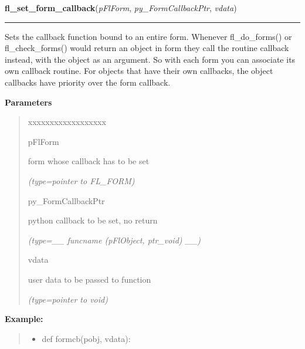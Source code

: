 \hspace{.8\funcindent}\begin{boxedminipage}{\funcwidth}

    \raggedright \textbf{fl\_set\_form\_callback}(\textit{pFlForm}, \textit{py\_FormCallbackPtr}, \textit{vdata})

    \vspace{-1.5ex}

    \rule{\textwidth}{0.5\fboxrule}
\setlength{\parskip}{2ex}
    Sets the callback function bound to an entire form. Whenever 
    fl\_do\_forms() or fl\_check\_forms() would return an object in form 
    they call the routine callback instead, with the object as an argument.
    So with each form you can associate its own callback routine. For 
    objects that have their own callbacks, the object callbacks have 
    priority over the form callback.

\setlength{\parskip}{1ex}
      \textbf{Parameters}
      \vspace{-1ex}

      \begin{quote}
        \begin{Ventry}{xxxxxxxxxxxxxxxxxx}

          \item[pFlForm]

          form whose callback has to be set

            {\it (type=pointer to FL\_FORM)}

          \item[py\_FormCallbackPtr]

          python callback to be set, no return

            {\it (type=\_\_ funcname (pFlObject, ptr\_void) \_\_)}

          \item[vdata]

          user data to be passed to function

            {\it (type=pointer to void)}

        \end{Ventry}

      \end{quote}

\textbf{Example:}
\begin{quote}
  \begin{itemize}

  \item
    \setlength{\parskip}{0.6ex}
def formcb(pobj, vdata):




\end{itemize}
\end{quote}
\end{boxedminipage}
